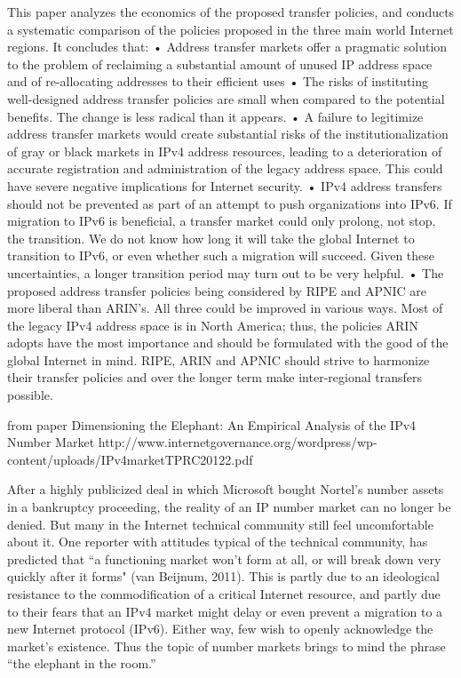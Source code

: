 \documentclass[11pt]{report}
\begin{document}
This paper analyzes the economics of the proposed transfer policies, and
conducts a systematic comparison of the policies proposed in the three main world
Internet regions. It concludes that:
• Address transfer markets offer a pragmatic solution to the problem of reclaiming
a substantial amount of unused IP address space and of re-allocating addresses to
their efficient uses
• The risks of instituting well-designed address transfer policies are small when
compared to the potential benefits. The change is less radical than it appears.
• A failure to legitimize address transfer markets would create substantial risks of
the institutionalization of gray or black markets in IPv4 address resources, leading
to a deterioration of accurate registration and administration of the legacy address
space. This could have severe negative implications for Internet security.
• IPv4 address transfers should not be prevented as part of an attempt to push
organizations into IPv6. If migration to IPv6 is beneficial, a transfer market could
only prolong, not stop, the transition. We do not know how long it will take the
global Internet to transition to IPv6, or even whether such a migration will
succeed. Given these uncertainties, a longer transition period may turn out to be
very helpful.
• The proposed address transfer policies being considered by RIPE and APNIC are
more liberal than ARIN’s. All three could be improved in various ways. Most of the
legacy IPv4 address space is in North America; thus, the policies ARIN adopts have
the most importance and should be formulated with the good of the global
Internet in mind. RIPE, ARIN and APNIC should strive to harmonize their transfer
policies and over the longer term make inter-regional transfers possible.


from paper Dimensioning the Elephant: An Empirical Analysis of the IPv4 Number Market http://www.internetgovernance.org/wordpress/wp-content/uploads/IPv4marketTPRC20122.pdf

After a highly publicized deal in which Microsoft bought Nortel’s number assets in a bankruptcy proceeding, the reality of an IP number market can no longer be denied. But many in the Internet technical community still feel uncomfortable about it. One reporter with attitudes typical of the technical community, has predicted that “a functioning market won't form at all, or will break down very quickly after it forms" (van Beijnum, 2011). This is partly due to an ideological resistance to the commodification of a critical Internet resource, and partly due to their fears that an IPv4 market might delay or even prevent a migration to a new Internet protocol (IPv6). Either way, few wish to openly acknowledge the market’s existence. Thus the topic of number markets brings to mind the phrase “the elephant in the room.” 
\end{document}
